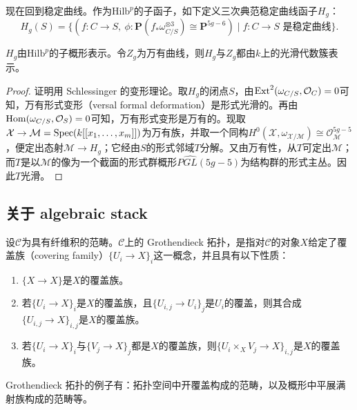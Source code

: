 现在回到稳定曲线。作为$\mathrm{Hilb}^p$的子函子，如下定义三次典范稳定曲线函子$H_g$：
\[
H_g(S)=\{(f:C\to S,\ \phi:\mathbf{P}(f_*\omega_{C/S}^{\otimes3})\cong\mathbf{P}^{5g-6})\mid f:C\to S\text{ 是稳定曲线}\}.
\]

\begin{theorem}
$H_g$由$\mathrm{Hilb}^p$的子概形表示。令$Z_g$为万有曲线，则$H_g$与$Z_g$都由$k$上的光滑代数簇表示。
\end{theorem}

\begin{proof}
证明用 Schlessinger 的变形理论。取$H_g$的闭点$S$，由$\operatorname{Ext}^2(\omega_{C/S},\mathcal{O}_C)=0$可知，万有形式变形（versal formal deformation）是形式光滑的。再由$\operatorname{Hom}(\omega_{C/S},\mathcal{O}_S)=0$可知，万有形式变形是万有的。现取$\mathcal{X}\to\mathcal{M}=\operatorname{Spec}(k[[x_1,\ldots,x_m]])$为万有族，并取一个同构$H^0(\mathcal{X},\omega_{\mathcal{X}/\mathcal{M}})\cong\mathcal{O}_{\mathcal{M}}^{5g-5}$，便定出态射$\mathcal{M}\to H_g$；它经由$S$的形式邻域$T$分解。又由万有性，从$T$可定出$\mathcal{M}$；而$T$是以$\mathcal{M}$的像为一个截面的形式群概形$P\widehat{GL}(5g-5)$为结构群的形式主丛。因此$T$光滑。
\end{proof}


\subsection{关于 algebraic stack}

\begin{definition}
设$\mathcal{C}$为具有纤维积的范畴。$\mathcal{C}$上的 Grothendieck 拓扑，是指对$\mathcal{C}$的对象$X$给定了覆盖族（covering family）$\{U_i\to X\}_i$这一概念，并且具有以下性质：
\begin{enumerate}[label=(\arabic*)]
\item $\{X\to X\}$是$X$的覆盖族。
\item 若$\{U_i\to X\}_i$是$X$的覆盖族，且$\{U_{i,j}\to U_i\}_j$是$U_i$的覆盖，则其合成$\{U_{i,j}\to X\}_{i,j}$是$X$的覆盖族。
\item 若$\{U_i\to X\}_i$与$\{V_j\to X\}_j$都是$X$的覆盖族，则$\{U_i\times_XV_j\to X\}_{i,j}$是$X$的覆盖族。
\end{enumerate}
\end{definition}

Grothendieck 拓扑的例子有：拓扑空间中开覆盖构成的范畴，以及概形中平展满射族构成的范畴等。

